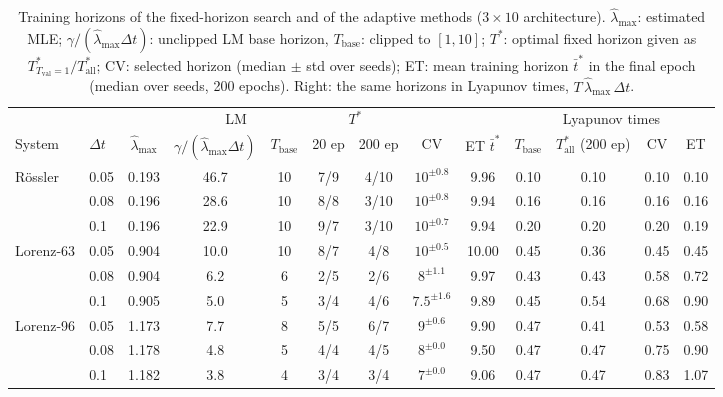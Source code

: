 \begin{table}[htbp]
  \centering
  \caption{Training horizons of the fixed-horizon search and of the adaptive methods ($3 \times 10$ architecture). $\hat\lambda_{\max}$: estimated MLE; $\gamma/(\hat\lambda_{\max}\Delta t)$: unclipped LM base horizon, $T_{\mathrm{base}}$: clipped to $[1, 10]$; $T^*$: optimal fixed horizon given as $T^*_{T_{\mathrm{val}}=1}/T^*_{\mathrm{all}}$; CV: selected horizon (median $\pm$ std over seeds); ET: mean training horizon $\bar t^*$ in the final epoch (median over seeds, 200 epochs). Right: the same horizons in Lyapunov times, $T\,\hat\lambda_{\max}\,\Delta t$.}
  \label{tab:horizons}
  \footnotesize
  \setlength{\tabcolsep}{3pt}
  \begin{adjustbox}{max width=\textwidth}
  \begin{tabular}{ll c cc cc cc cccc}
    \toprule
    & & & \multicolumn{2}{c}{LM} & \multicolumn{2}{c}{$T^*$} & & & \multicolumn{4}{c}{Lyapunov times} \\
    \cmidrule(lr){4-5}\cmidrule(lr){6-7}\cmidrule(lr){10-13}
    System & $\Delta t$ & $\hat\lambda_{\max}$ & $\gamma/(\hat\lambda_{\max}\Delta t)$ & $T_{\mathrm{base}}$
 & 20 ep & 200 ep & CV & ET $\bar t^*$ & $T_{\mathrm{base}}$ & $T^*_{\mathrm{all}}$ (200 ep) & CV & ET \\
    \midrule
    Rössler & 0.05 & 0.193 & 46.7 & 10 & 7/9 & 4/10 & $10^{\pm 0.8}$ & 9.96 & 0.10 & 0.10 & 0.10 & 0.10 \\
     & 0.08 & 0.196 & 28.6 & 10 & 8/8 & 3/10 & $10^{\pm 0.8}$ & 9.94 & 0.16 & 0.16 & 0.16 & 0.16 \\
     & 0.1 & 0.196 & 22.9 & 10 & 9/7 & 3/10 & $10^{\pm 0.7}$ & 9.94 & 0.20 & 0.20 & 0.20 & 0.19 \\
    \midrule
    Lorenz-63 & 0.05 & 0.904 & 10.0 & 10 & 8/7 & 4/8 & $10^{\pm 0.5}$ & 10.00 & 0.45 & 0.36 & 0.45 & 0.45 \\
     & 0.08 & 0.904 & 6.2 & 6 & 2/5 & 2/6 & $8^{\pm 1.1}$ & 9.97 & 0.43 & 0.43 & 0.58 & 0.72 \\
     & 0.1 & 0.905 & 5.0 & 5 & 3/4 & 4/6 & $7.5^{\pm 1.6}$ & 9.89 & 0.45 & 0.54 & 0.68 & 0.90 \\
    \midrule
    Lorenz-96 & 0.05 & 1.173 & 7.7 & 8 & 5/5 & 6/7 & $9^{\pm 0.6}$ & 9.90 & 0.47 & 0.41 & 0.53 & 0.58 \\
     & 0.08 & 1.178 & 4.8 & 5 & 4/4 & 4/5 & $8^{\pm 0.0}$ & 9.50 & 0.47 & 0.47 & 0.75 & 0.90 \\
     & 0.1 & 1.182 & 3.8 & 4 & 3/4 & 3/4 & $7^{\pm 0.0}$ & 9.06 & 0.47 & 0.47 & 0.83 & 1.07 \\
    \bottomrule
  \end{tabular}
  \end{adjustbox}
\end{table}
